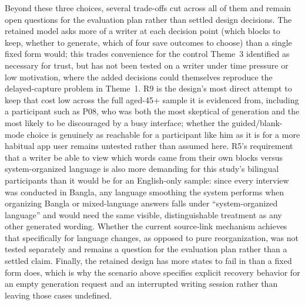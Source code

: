 \documentclass[sigconf,nonacm]{acmart}
\begin{document}
Beyond these three choices, several trade-offs cut across all of them and
remain open questions for the evaluation plan rather than settled design
decisions. The retained model asks more of a writer at each decision point
(which blocks to keep, whether to generate, which of four save outcomes to
choose) than a single fixed form would; this trades convenience for the
control Theme~3 identified as necessary for trust, but has not been tested on
a writer under time pressure or low motivation, where the added decisions
could themselves reproduce the delayed-capture problem in Theme~1. R9 is the
design's most direct attempt to keep that cost low across the full aged-45+
sample it is evidenced from, including a participant such as P08, who was
both the most skeptical of generation and the most likely to be discouraged
by a busy interface; whether the guided/blank-mode choice is genuinely as
reachable for a participant like him as it is for a more habitual app user
remains untested rather than assumed here. R5's requirement that a writer be
able to view which words came from their own blocks versus system-organized
language is also more demanding for this study's bilingual participants than
it would be for an English-only sample: since every interview was conducted
in Bangla, any language smoothing the system performs when organizing Bangla
or mixed-language answers falls under ``system-organized language'' and would
need the same visible, distinguishable treatment as any other generated
wording. Whether the current source-link mechanism achieves that specifically
for language changes, as opposed to pure reorganization, was not tested
separately and remains a question for the evaluation plan rather than a
settled claim. Finally, the retained design has more states
to fail in than a fixed form does, which is why the scenario above specifies
explicit recovery behavior for an empty generation request and an interrupted
writing session rather than leaving those cases undefined.
\end{document}

